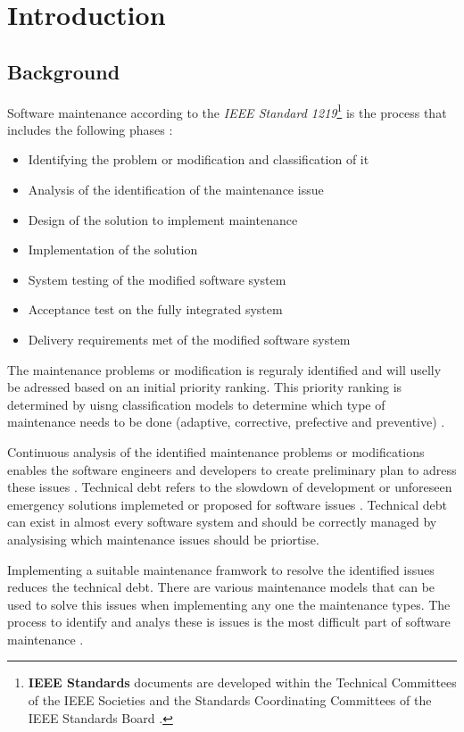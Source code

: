 \chapter{Introduction}
\label{chap:1}

\section{Background}\label{section:background}

Software maintenance according to the \textit{IEEE Standard 1219}\footnote{\textbf{IEEE Standards} documents are developed within the Technical Committees of the IEEE Societies and the Standards Coordinating Committees of the IEEE Standards Board \cite{Mamone1994}.} is the process that includes the following phases \cite{Mamone1994, Hasan2012}:
\begin{itemize}
	\item Identifying the problem or modification and classification of it
	\item Analysis of the identification of the maintenance issue
	\item Design of the solution to implement maintenance
	\item Implementation of the solution
	\item System testing of the modified software system
	\item Acceptance test on the fully integrated system
	\item Delivery requirements met of the modified software system
\end{itemize}

The maintenance problems or modification is reguraly identified and will uselly be adressed based on an initial priority ranking. This priority ranking is determined by uisng classification models to determine which type of maintenance needs to be done (adaptive, corrective, prefective and preventive) \cite{Tang2010,Mamone1994,Ping2010}.\par Continuous analysis of the identified maintenance problems or modifications enables the software engineers and developers to create preliminary plan to adress these issues \cite{Port2017}. Technical debt refers to the slowdown of development or unforeseen emergency solutions implemeted or proposed for software issues \cite{DeLeon-Sigg2020}. Technical debt can exist in almost every software system and should be correctly managed by analysising which maintenance issues should be priortise.\par Implementing a suitable maintenance framwork to resolve the identified issues reduces the technical debt. There are various maintenance models that can be used to solve this issues when implementing any one the maintenance types. The process to identify and analys these is issues is the most difficult part of software maintenance \cite{DeLeon-Sigg2020}.


